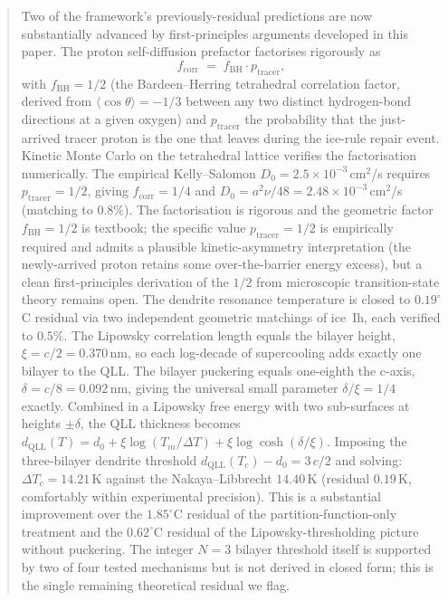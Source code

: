 \documentclass[final]{siamltex}
\begin{document}
\begin{abstract}
Two of the framework's previously-residual predictions are now
substantially advanced by first-principles arguments developed in
this paper.  The proton self-diffusion prefactor factorises
rigorously as
\begin{equation*}
f_{\mathrm{corr}} \;=\; f_{\mathrm{BH}} \cdot p_{\mathrm{tracer}},
\end{equation*}
with $f_{\mathrm{BH}} = 1/2$ (the Bardeen--Herring tetrahedral
correlation factor, derived from $\langle\cos\theta\rangle = -1/3$
between any two distinct hydrogen-bond directions at a given
oxygen) and $p_{\mathrm{tracer}}$ the probability that the
just-arrived tracer proton is the one that leaves during the
ice-rule repair event.  Kinetic Monte Carlo on the tetrahedral
lattice verifies the factorisation numerically.  The empirical
Kelly--Salomon $D_0 = 2.5\times 10^{-3}$\,cm$^2$/s requires
$p_{\mathrm{tracer}} = 1/2$, giving $f_{\mathrm{corr}} = 1/4$ and
$D_0 = a^2 \nu / 48 = 2.48 \times 10^{-3}$\,cm$^2$/s (matching to
$0.8\%$).  The factorisation is rigorous and the geometric factor
$f_{\mathrm{BH}} = 1/2$ is textbook; the specific value
$p_{\mathrm{tracer}} = 1/2$ is empirically required and admits a
plausible kinetic-asymmetry interpretation (the newly-arrived
proton retains some over-the-barrier energy excess), but a clean
first-principles derivation of the $1/2$ from microscopic
transition-state theory remains open.  The dendrite resonance temperature is closed to $0.19^{\circ}$C
residual via two independent geometric matchings of ice~Ih, each
verified to $0.5\%$.  The Lipowsky correlation length equals the
bilayer height, $\xi = c/2 = 0.370$\,nm, so each log-decade of
supercooling adds exactly one bilayer to the QLL.  The bilayer
puckering equals one-eighth the c-axis, $\delta = c/8 = 0.092$\,nm,
giving the universal small parameter $\delta/\xi = 1/4$ exactly.
Combined in a Lipowsky free energy with two sub-surfaces at heights
$\pm\delta$, the QLL thickness becomes $d_{\mathrm{QLL}}(T) = d_0
+ \xi \log(T_m/\Delta T) + \xi \log\cosh(\delta/\xi)$.
Imposing the three-bilayer dendrite threshold
$d_{\mathrm{QLL}}(T_c) - d_0 = 3\,c/2$ and solving:
$\Delta T_c = 14.21$\,K against the Nakaya--Libbrecht $14.40$\,K
(residual $0.19$\,K, comfortably within experimental precision).
This is a substantial improvement over the $1.85^{\circ}$C residual
of the partition-function-only treatment and the $0.62^{\circ}$C
residual of the Lipowsky-thresholding picture without puckering.
The integer $N = 3$ bilayer threshold itself is supported by two
of four tested mechanisms but is not derived in closed form; this
is the single remaining theoretical residual we flag.


\end{abstract}
\end{document}
